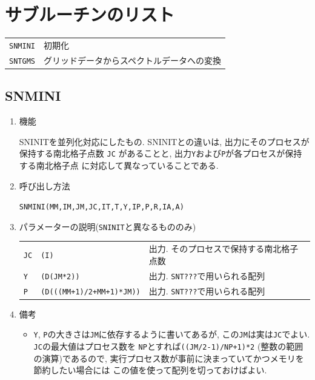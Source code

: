 \documentclass[a4j,fleqn]{jarticle}
\begin{document}
\section{サブルーチンのリスト}

\vspace{1em}
\begin{tabular}{ll}
{\tt SNMINI} & 初期化\\
{\tt SNTGMS} & グリッドデータからスペクトルデータへの変換
\end{tabular}


\subsection{SNMINI}

\begin{enumerate}

\item 機能

SNINITを並列化対応にしたもの.
SNINITとの違いは, 出力にそのプロセスが保持する南北格子点数 {\tt JC}
があることと, 出力{\tt Y}および{\tt P}が各プロセスが保持する南北格子点
に対応して異なっていることである.

\item 呼び出し方法 
    
{\tt SNMINI(MM,IM,JM,JC,IT,T,Y,IP,P,R,IA,A)}
  
\item パラメーターの説明({\tt SNINIT}と異なるもののみ)
    
\begin{tabular}{lll}
{\tt JC} & {\tt (I)} & 出力. そのプロセスで保持する南北格子点数\\
{\tt Y}  & {\tt (D(JM*2))} & 出力. {\tt SNT???}で用いられる配列\\
{\tt P}  & {\tt (D(((MM+1)/2+MM+1)*JM))} & 出力. {\tt SNT???}で用いられる配列\\
\end{tabular}

\item 備考

\begin{itemize}

\item {\tt Y}, {\tt P}の大きさは{\tt JM}に依存するように書いてあるが,
この{\tt JM}は実は{\tt JC}でよい. {\tt JC}の最大値はプロセス数を
{\tt NP}とすれば{\tt ((JM/2-1)/NP+1)*2} (整数の範囲の演算)であるので,
実行プロセス数が事前に決まっていてかつメモリを節約したい場合には
この値を使って配列を切っておけばよい.

\end{itemize}

\end{enumerate}
\end{document}
